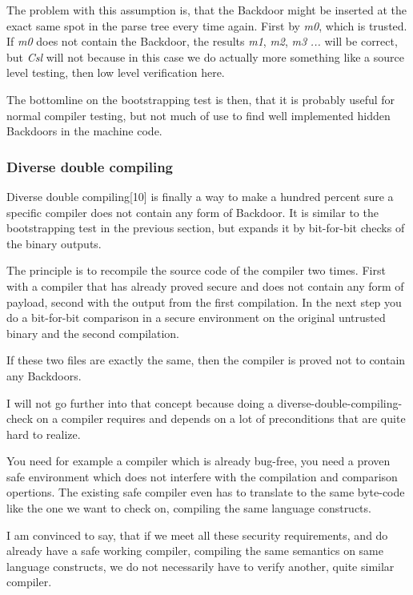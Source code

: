 \documentclass[a4paper, 12pt]{article}
\begin{document}
The problem with this assumption is, that the Backdoor might be inserted at the exact same spot in the parse tree every time again. First by \emph{m0}, which is trusted. If \emph{m0} does not contain the Backdoor, the results \emph{m1}, \emph{m2}, \emph{m3} \emph{...} will be correct, but \emph{Csl} will not because in this case we do actually more something like a source level testing, then low level verification here.

The bottomline on the bootstrapping test is then, that it is probably useful for normal compiler testing, but not much of use to find well implemented hidden Backdoors in the machine code.

\subsubsection{Diverse double compiling}

Diverse double compiling[10] is finally a way to make a hundred percent sure a specific compiler does not contain any form of Backdoor. It is similar to the bootstrapping test in the previous section, but expands it by bit-for-bit checks of the binary outputs.

The principle is to recompile the source code of the compiler two times. First with a compiler that has already proved secure and does not contain any form of payload, second with the output from the first compilation. In the next step you do a bit-for-bit comparison in a secure environment on the original untrusted binary and the second compilation.

If these two files are exactly the same, then the compiler is proved not to contain any Backdoors.

I will not go further into that concept because doing a diverse-double-compiling-check on a compiler requires and depends on a lot of preconditions that are quite hard to realize.

You need for example a compiler which is already bug-free, you need a proven safe environment which does not interfere with the compilation and comparison opertions. The existing safe compiler even has to translate to the same byte-code like the one we want to check on, compiling the same language constructs. 

I am convinced to say, that if we meet all these security requirements, and do already have a safe working compiler, compiling the same semantics on same language constructs, we do not necessarily have to verify another, quite similar compiler.
\end{document}
